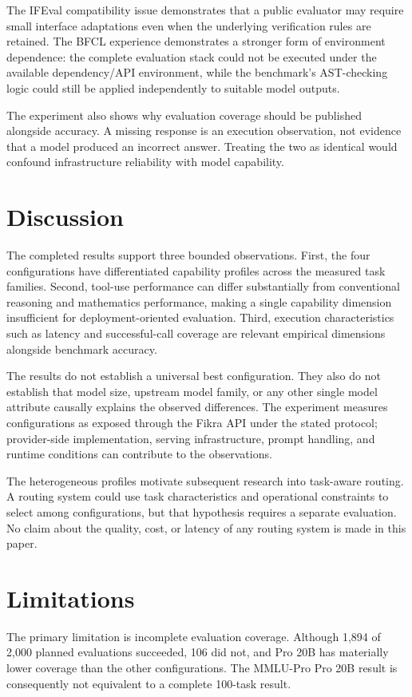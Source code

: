 \documentclass[11pt]{article}
\begin{document}
The IFEval compatibility issue demonstrates that a public evaluator may require small interface adaptations even when the underlying verification rules are retained. The BFCL experience demonstrates a stronger form of environment dependence: the complete evaluation stack could not be executed under the available dependency/API environment, while the benchmark's AST-checking logic could still be applied independently to suitable model outputs.

The experiment also shows why evaluation coverage should be published alongside accuracy. A missing response is an execution observation, not evidence that a model produced an incorrect answer. Treating the two as identical would confound infrastructure reliability with model capability.

\section{Discussion}
The completed results support three bounded observations. First, the four configurations have differentiated capability profiles across the measured task families. Second, tool-use performance can differ substantially from conventional reasoning and mathematics performance, making a single capability dimension insufficient for deployment-oriented evaluation. Third, execution characteristics such as latency and successful-call coverage are relevant empirical dimensions alongside benchmark accuracy.

The results do not establish a universal best configuration. They also do not establish that model size, upstream model family, or any other single model attribute causally explains the observed differences. The experiment measures configurations as exposed through the Fikra API under the stated protocol; provider-side implementation, serving infrastructure, prompt handling, and runtime conditions can contribute to the observations.

The heterogeneous profiles motivate subsequent research into task-aware routing. A routing system could use task characteristics and operational constraints to select among configurations, but that hypothesis requires a separate evaluation. No claim about the quality, cost, or latency of any routing system is made in this paper.

\section{Limitations}
The primary limitation is incomplete evaluation coverage. Although 1,894 of 2,000 planned evaluations succeeded, 106 did not, and Pro 20B has materially lower coverage than the other configurations. The MMLU-Pro Pro 20B result is consequently not equivalent to a complete 100-task result.
\end{document}
